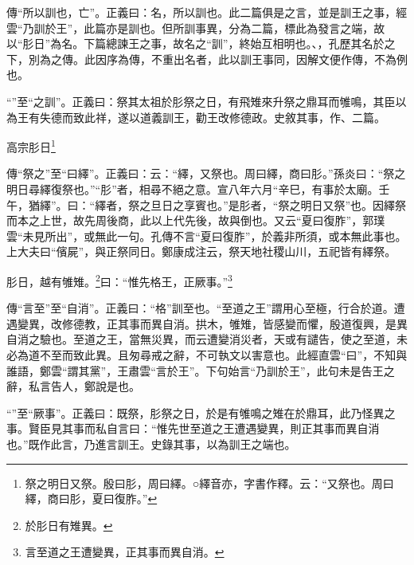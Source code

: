 {\noindent\zhuan{}\fzbyks 傳“所以訓也，亡”。正義曰：名，所以訓也。此二篇俱是之言，並是訓王之事，經雲“乃訓於王”，此篇亦是訓也。但所訓事異，分為二篇，標此為發言之端，故以“肜日”為名。下篇總諫王之事，故名之“訓”，終始互相明也。、，孔歷其名於之下，別為之傳。此因序為傳，不重出名者，此以訓王事同，因解文便作傳，不為例也。 \par}

{\noindent\shu{}\fzkt “”至“之訓”。正義曰：祭其太祖於肜祭之日，有飛雉來升祭之鼎耳而雊鳴，其臣以為王有失德而致此祥，遂以道義訓王，勸王改修德政。史敘其事，作、二篇。 \par}

高宗肜日\footnote{祭之明日又祭。殷曰肜，周曰繹。○繹音亦，字書作釋。云：“又祭也。周曰繹，商曰肜，夏曰復胙。”}

{\noindent\zhuan{}\fzbyks 傳“祭之”至“曰繹”。正義曰：云：“繹，又祭也。周曰繹，商曰肜。”孫炎曰：“祭之明日尋繹復祭也。”“肜”者，相尋不絕之意。宣八年六月“辛巳，有事於太廟。壬午，猶繹”。曰：“繹者，祭之旦日之享賓也。”是肜者，“祭之明日又祭”也。因繹祭而本之上世，故先周後商，此以上代先後，故與倒也。又云“夏曰復胙”，郭璞雲“未見所出”，或無此一句。孔傳不言“夏曰復胙”，於義非所須，或本無此事也。上大夫曰“儐屍”，與正祭同日。鄭康成注云，祭天地社稷山川，五祀皆有繹祭。 \par}

肜日，越有雊雉。\footnote{於肜日有雉異。}曰：“惟先格王，正厥事。”\footnote{言至道之王遭變異，正其事而異自消。}


{\noindent\zhuan{}\fzbyks 傳“言至”至“自消”。正義曰：“格”訓至也。“至道之王”謂用心至極，行合於道。遭遇變異，改修德教，正其事而異自消。拱木，雊雉，皆感變而懼，殷道復興，是異自消之驗也。至道之王，當無災異，而云遭變消災者，天或有譴告，使之至道，未必為道不至而致此異。且匆尋戒之辭，不可執文以害意也。此經直雲“曰”，不知與誰語，鄭雲“謂其黨”，王肅雲“言於王”。下句始言“乃訓於王”，此句未是告王之辭，私言告人，鄭說是也。 \par}

{\noindent\shu{}\fzkt “”至“厥事”。正義曰：既祭，肜祭之日，於是有雊鳴之雉在於鼎耳，此乃怪異之事。賢臣見其事而私自言曰：“惟先世至道之王遭遇變異，則正其事而異自消也。”既作此言，乃進言訓王。史錄其事，以為訓王之端也。 \par}

